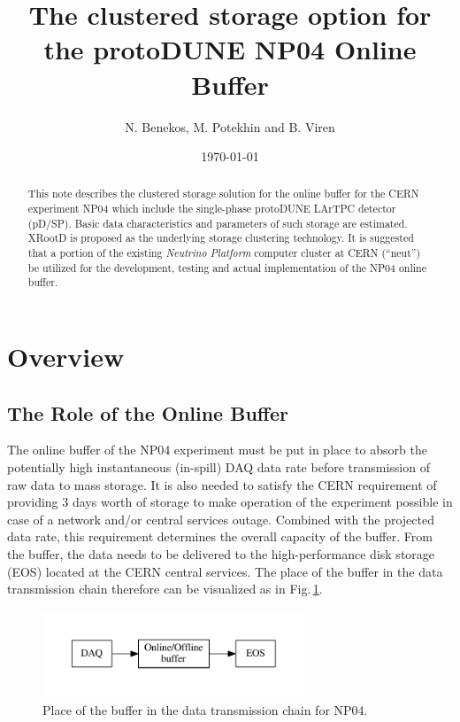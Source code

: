 \documentclass[pdftex,12pt,letter]{article}
\title{The clustered storage option for the protoDUNE NP04 Online Buffer}
\date{\today}
\author{N. Benekos, M. Potekhin and B. Viren}
\newcommand{\pdsp}{pD/SP\xspace}
\newcommand{\xrd}{XRootD\xspace}
\begin{document}
\maketitle

\begin{abstract}
\noindent  This note describes the clustered storage
solution for the online buffer for the CERN experiment NP04 which include the single-phase protoDUNE LArTPC detector (\pdsp).
Basic data characteristics and  parameters of such storage are estimated. \xrd is proposed as the underlying
storage clustering technology. It is suggested that a portion of the existing   \textit{Neutrino Platform}
computer cluster at CERN (``neut'') be utilized for the development, testing and actual implementation of the NP04 online buffer. 
\end{abstract}

\section{Overview}
\subsection{The Role of the Online Buffer}
\label{sec:the_role}
The online buffer of the NP04 experiment must be put in place to absorb the potentially high instantaneous (in-spill) DAQ
data rate before transmission of raw data to mass storage. It is also needed to satisfy the CERN requirement of providing
3 days worth of storage to make operation of the experiment possible in case of a network and/or central services outage.
Combined with the projected data rate, this requirement determines the overall capacity of the buffer. From the buffer,
the data needs to be delivered to the high-performance  disk storage (EOS) located at the CERN central services.
The place of the buffer in the data transmission chain therefore can be visualized as in Fig.\,\ref{fig:big-picture}.
\begin{figure}[tbh]
  \centering
  \includegraphics[width=0.7\textwidth]{figures/big-picture.pdf}
  \caption{Place of the buffer in the data transmission chain for NP04.}
  \label{fig:big-picture}
\end{figure}
\end{document}
